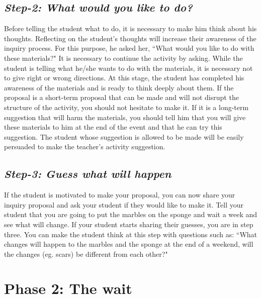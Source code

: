 \documentclass[11.5pt]{sig-alternate}
\begin{document}
\begin{large}
\subsection*{\textit{Step-2: What would you like to do?}}
Before telling the student what to do, it is necessary to make him think about his thoughts. Reflecting on the student's thoughts will increase their awareness of the inquiry process. For this purpose, he asked her, ``What would you like to do with these materials?" It is necessary to continue the activity by asking. While the student is telling what he/she wants to do with the materials, it is necessary not to give right or wrong directions. At this stage, the student has completed his awareness of the materials and is ready to think deeply about them. If the proposal is a short-term proposal that can be made and will not disrupt the structure of the activity, you should not hesitate to make it. If it is a long-term suggestion that will harm the materials, you should tell him that you will give these materials to him at the end of the event and that he can try this suggestion. The student whose suggestion is allowed to be made will be easily persuaded to make the teacher's activity suggestion.

\subsection*{\textit{Step-3: Guess what will happen}}
If the student is motivated to make your proposal, you can now share your inquiry proposal and ask your student if they would like to make it. Tell your student that you are going to put the marbles on the sponge and wait a week and see what will change. If your student starts sharing their guesses, you are in step three. You can make the student think at this step with questions such as: ``What changes will happen to the marbles and the sponge at the end of a weekend, will the changes (eg. scars) be different from each other?" 

\section*{Phase 2: The wait}


\end{large}
\end{document}
